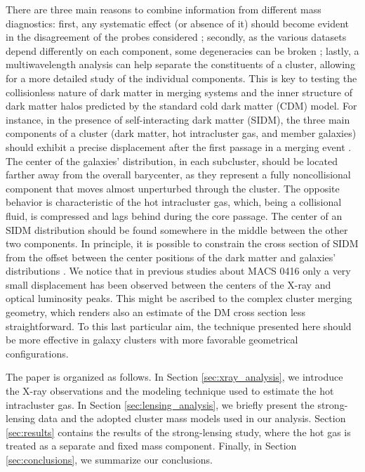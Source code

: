 \documentclass[twocolumn]{aastex61}
\begin{document}
There are three main reasons to combine information from different mass diagnostics:
first, any systematic effect (or absence of it) should become evident in the
disagreement of the probes considered \citep{Balestra2016}; secondly, as the
various datasets depend differently on each component, some degeneracies can be
broken \citep[for instance, projection effects;][]{Limousin2013}; lastly, a
multiwavelength analysis can help separate the constituents of a cluster,
allowing for a more detailed study of the individual components.
This is key to testing the collisionless nature of dark matter in
merging systems and the inner structure of dark matter halos predicted by the
standard cold dark matter (CDM) model.
For instance, in the presence of self-interacting dark matter (SIDM), the three main
components of a cluster (dark matter, hot intracluster gas, and member galaxies)
should exhibit a precise displacement after the first
passage in a merging event \citep{Markevitch2004,Harvey2015}.
The center of the galaxies' distribution, in each subcluster, should be located
farther away from the overall barycenter, as they represent a fully
noncollisional component that moves almost unperturbed through the cluster.
The opposite behavior is characteristic of the hot intracluster gas, which, being
a collisional fluid, is compressed and lags behind during the core passage.
The center of an SIDM distribution should be found
somewhere in the middle between the other two components.
In principle, it is possible to constrain the cross section of SIDM from the offset
between the center positions of the dark matter and galaxies' distributions
\citep{Markevitch2004,Harvey2015}.
We notice that in previous studies about MACS 0416 \citep[e.g.,][]{Ogrean2015}
only a very small displacement has been observed between the centers of the
X-ray and optical luminosity peaks.
This might be ascribed to the complex cluster merging geometry, which renders
also an estimate of the DM cross section less straightforward.
To this last particular aim, the technique presented here should be more
effective in galaxy clusters with more favorable geometrical configurations.

The paper is organized as follows.
In Section \ref{sec:xray_analysis}, we introduce the X-ray observations and the
modeling technique used to estimate the hot intracluster gas.
In Section \ref{sec:lensing_analysis}, we briefly present the strong-lensing data
and the adopted cluster mass models used in our analysis.
Section \ref{sec:results} contains the results of the strong-lensing study,
where the hot gas is treated as a separate and fixed mass component.
Finally, in Section \ref{sec:conclusions}, we summarize our conclusions.
\end{document}
